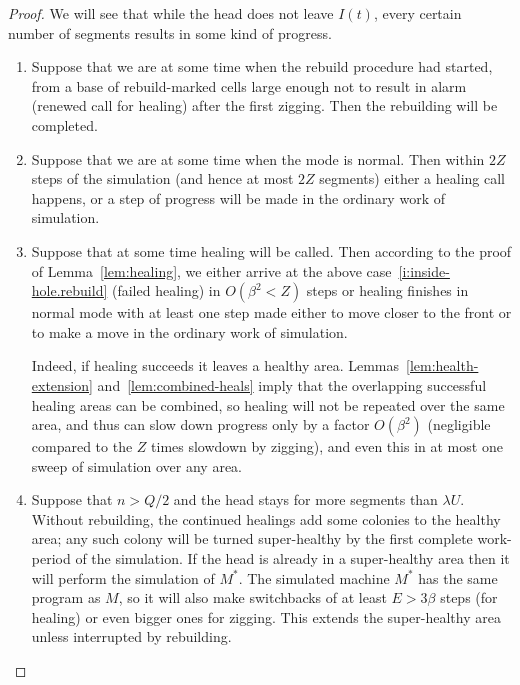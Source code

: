 \documentclass[11pt]{memoir}
\theoremstyle{definition} %
\def\U{U}
\newcommand{\E}{E}
\newcommand{\Q}{Q}
\newcommand{\Z}{Z}
\begin{document}
\begin{proof}
  We will see that while the head does not leave \( I(t) \),
  every certain number of segments results in some kind of progress.
  \begin{enumerate}
  \item\label{i:inside-hole.rebuild}
Suppose that we are at some time when the rebuild procedure had started,
from a base of rebuild-marked cells large enough not to result in alarm (renewed call for healing)
after the first zigging.
Then the rebuilding will be completed.

\item\label{i:inside-hole.normal}
  Suppose that we are at some time when the mode is normal.
  Then within \( 2\Z \) steps of the simulation (and hence at most \( 2\Z \) segments)
  either a healing call happens, or a step of progress will be
  made in the ordinary work of simulation.
  
\item\label{i:inside-hole.alarm}
  Suppose that at some time healing will be called.
  Then according to the proof of Lemma~\ref{lem:healing},
  we either arrive at the above case~\ref{i:inside-hole.rebuild} (failed healing)
  in \( O(\beta^{2}<\Z) \) steps or healing finishes in
  normal mode with at least one step made either to move closer to the front or to make a move
  in the ordinary work of simulation.
  
  Indeed, if healing succeeds it leaves a healthy area.
  Lemmas~\ref{lem:health-extension} and~\ref{lem:combined-heals} imply that 
  the overlapping successful healing areas can be combined, so healing will not be repeated over the same
  area, and thus can slow down progress only by a 
  factor \( O(\beta^{2}) \) (negligible compared to the \( \Z \) times slowdown by zigging), and even this
  in at most one sweep of simulation over any area.

\item\label{i:long-stay}  Suppose that \( n>\Q/2 \) and the head stays for more segments than
  \( \lambda\U \).
  Without rebuilding, the continued healings add some colonies to the healthy area; any such colony will be
  turned super-healthy by the first complete work-period of the simulation.
  If the head is already in a super-healthy area then it will perform the simulation of \( M^{*} \).
  The simulated machine \( M^{*} \) has the same program as \( M \), so it will also
  make switchbacks
  of at least \( \E>3\beta \) steps (for healing) or even bigger ones for zigging.
  This extends the super-healthy area unless interrupted by rebuilding.


\end{enumerate}
\end{proof}
\end{document}
